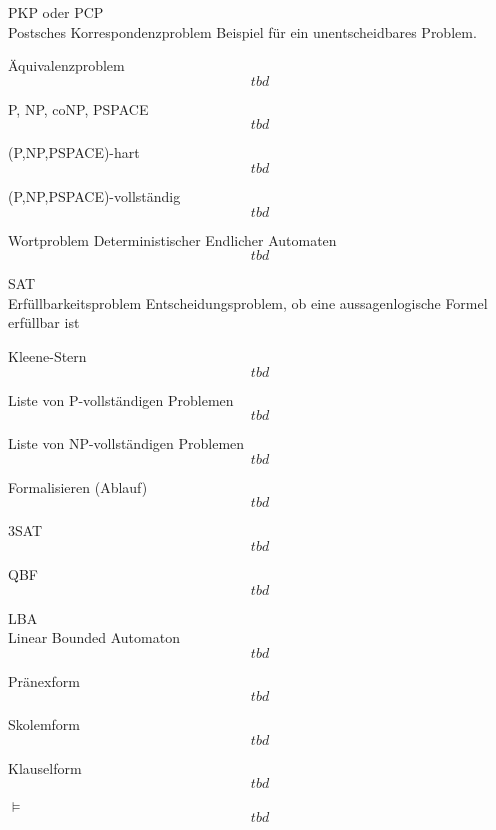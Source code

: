 \documentclass[a7paper,print,grid=both]{kartei}
\begin{document}
\begin{karte}{PKP oder PCP\\Postsches Korrespondenzproblem}
Beispiel für ein unentscheidbares Problem.
\end{karte}
\begin{karte}{Äquivalenzproblem}
\[tbd\]
\end{karte}
\begin{karte}{P, NP, coNP, PSPACE}
\[tbd\]
\end{karte}
\begin{karte}{(P,NP,PSPACE)-hart}
\[tbd\]
\end{karte}
\begin{karte}{(P,NP,PSPACE)-vollständig}
\[tbd\]
\end{karte}
\begin{karte}{Wortproblem Deterministischer Endlicher Automaten}
\[tbd\]
\end{karte}
\begin{karte}{SAT\\Erfüllbarkeitsproblem}
Entscheidungsproblem, ob eine aussagenlogische Formel erfüllbar ist
\end{karte}
\begin{karte}{Kleene-Stern}
\[tbd\]
\end{karte}
\begin{karte}{Liste von P-vollständigen Problemen}
\[tbd\]
\end{karte}
\begin{karte}{Liste von NP-vollständigen Problemen}
\[tbd\]
\end{karte}
\begin{karte}{Formalisieren (Ablauf)}
\[tbd\]
\end{karte}
\begin{karte}{3SAT}
\[tbd\]
\end{karte}
\begin{karte}{QBF}
\[tbd\]
\end{karte}
\begin{karte}{LBA\\Linear Bounded Automaton}
\[tbd\]
\end{karte}
\begin{karte}{Pränexform}
\[tbd\]
\end{karte}
\begin{karte}{Skolemform}
\[tbd\]
\end{karte}
\begin{karte}{Klauselform}
\[tbd\]
\end{karte}
\begin{karte}{$\models$}
\[tbd\]
\end{karte}
\end{document}
